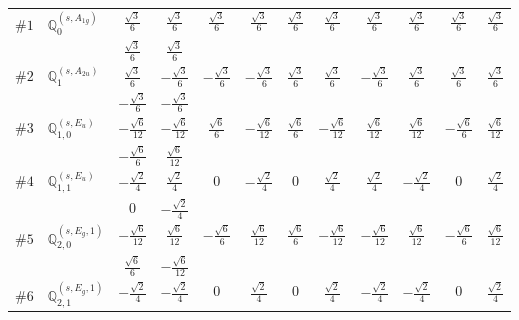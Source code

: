 \documentclass[fleqn,9pt,landscape]{jsarticle}
\begin{document}
\begin{center}
\begin{longtable}{lcccccccccc}
$ \#1\quad \mathbb{Q}_{0}^{(s,A_{1g})} $ & $ \frac{\sqrt{3}}{6} $ & $ \frac{\sqrt{3}}{6} $ & $ \frac{\sqrt{3}}{6} $ & $ \frac{\sqrt{3}}{6} $ & $ \frac{\sqrt{3}}{6} $ & $ \frac{\sqrt{3}}{6} $ & $ \frac{\sqrt{3}}{6} $ & $ \frac{\sqrt{3}}{6} $ & $ \frac{\sqrt{3}}{6} $ & $ \frac{\sqrt{3}}{6} $ \\
& $ \frac{\sqrt{3}}{6} $ & $ \frac{\sqrt{3}}{6} $ & $  $ & $  $ & $  $ & $  $ & $  $ & $  $ & $  $ & $  $ \\ \hline
$ \#2\quad \mathbb{Q}_{1}^{(s,A_{2u})} $ & $ \frac{\sqrt{3}}{6} $ & $ - \frac{\sqrt{3}}{6} $ & $ - \frac{\sqrt{3}}{6} $ & $ - \frac{\sqrt{3}}{6} $ & $ \frac{\sqrt{3}}{6} $ & $ \frac{\sqrt{3}}{6} $ & $ - \frac{\sqrt{3}}{6} $ & $ \frac{\sqrt{3}}{6} $ & $ \frac{\sqrt{3}}{6} $ & $ \frac{\sqrt{3}}{6} $ \\
& $ - \frac{\sqrt{3}}{6} $ & $ - \frac{\sqrt{3}}{6} $ & $  $ & $  $ & $  $ & $  $ & $  $ & $  $ & $  $ & $  $ \\ \hline
$ \#3\quad \mathbb{Q}_{1,0}^{(s,E_{u})} $ & $ - \frac{\sqrt{6}}{12} $ & $ - \frac{\sqrt{6}}{12} $ & $ \frac{\sqrt{6}}{6} $ & $ - \frac{\sqrt{6}}{12} $ & $ \frac{\sqrt{6}}{6} $ & $ - \frac{\sqrt{6}}{12} $ & $ \frac{\sqrt{6}}{12} $ & $ \frac{\sqrt{6}}{12} $ & $ - \frac{\sqrt{6}}{6} $ & $ \frac{\sqrt{6}}{12} $ \\
& $ - \frac{\sqrt{6}}{6} $ & $ \frac{\sqrt{6}}{12} $ & $  $ & $  $ & $  $ & $  $ & $  $ & $  $ & $  $ & $  $ \\ \hline
$ \#4\quad \mathbb{Q}_{1,1}^{(s,E_{u})} $ & $ - \frac{\sqrt{2}}{4} $ & $ \frac{\sqrt{2}}{4} $ & $ 0 $ & $ - \frac{\sqrt{2}}{4} $ & $ 0 $ & $ \frac{\sqrt{2}}{4} $ & $ \frac{\sqrt{2}}{4} $ & $ - \frac{\sqrt{2}}{4} $ & $ 0 $ & $ \frac{\sqrt{2}}{4} $ \\
& $ 0 $ & $ - \frac{\sqrt{2}}{4} $ & $  $ & $  $ & $  $ & $  $ & $  $ & $  $ & $  $ & $  $ \\ \hline
$ \#5\quad \mathbb{Q}_{2,0}^{(s,E_{g},1)} $ & $ - \frac{\sqrt{6}}{12} $ & $ \frac{\sqrt{6}}{12} $ & $ - \frac{\sqrt{6}}{6} $ & $ \frac{\sqrt{6}}{12} $ & $ \frac{\sqrt{6}}{6} $ & $ - \frac{\sqrt{6}}{12} $ & $ - \frac{\sqrt{6}}{12} $ & $ \frac{\sqrt{6}}{12} $ & $ - \frac{\sqrt{6}}{6} $ & $ \frac{\sqrt{6}}{12} $ \\
& $ \frac{\sqrt{6}}{6} $ & $ - \frac{\sqrt{6}}{12} $ & $  $ & $  $ & $  $ & $  $ & $  $ & $  $ & $  $ & $  $ \\ \hline
$ \#6\quad \mathbb{Q}_{2,1}^{(s,E_{g},1)} $ & $ - \frac{\sqrt{2}}{4} $ & $ - \frac{\sqrt{2}}{4} $ & $ 0 $ & $ \frac{\sqrt{2}}{4} $ & $ 0 $ & $ \frac{\sqrt{2}}{4} $ & $ - \frac{\sqrt{2}}{4} $ & $ - \frac{\sqrt{2}}{4} $ & $ 0 $ & $ \frac{\sqrt{2}}{4} $ \\

\end{longtable}
\end{center}
\end{document}
